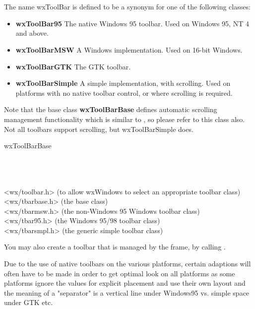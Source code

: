 \section{}\label{wxtoolbar}

The name wxToolBar is defined to be a synonym for one of the following classes:

\begin{itemize}\itemsep=0pt
\item {\bf wxToolBar95} The native Windows 95 toolbar. Used on Windows 95, NT 4 and above.
\item {\bf wxToolBarMSW} A Windows implementation. Used on 16-bit Windows.
\item {\bf wxToolBarGTK} The GTK toolbar.
\item {\bf wxToolBarSimple} A simple implementation, with scrolling.
Used on platforms with no native toolbar control, or where scrolling is required.
\end{itemize}

Note that the base class {\bf wxToolBarBase} defines
automatic scrolling management functionality which is similar
to , so please refer to this class also.
Not all toolbars support scrolling, but wxToolBarSimple does.


wxToolBarBase\\
\\
\\
\\


<wx/toolbar.h> (to allow wxWindows to select an appropriate toolbar class)\\
<wx/tbarbase.h> (the base class)\\
<wx/tbarmsw.h> (the non-Windows 95 Windows toolbar class)\\
<wx/tbar95.h> (the Windows 95/98 toolbar class)\\
<wx/tbarsmpl.h> (the generic simple toolbar class)


You may also create a toolbar that is managed by the frame, by
calling .

Due to the use of native toolbars on the various platforms, certain adaptions will
often have to be made in order to get optimal look on all platforms as some platforms
ignore the values for explicit placement and use their own layout and the meaning
of a "separator" is a vertical line under Windows95 vs. simple space under GTK etc.

